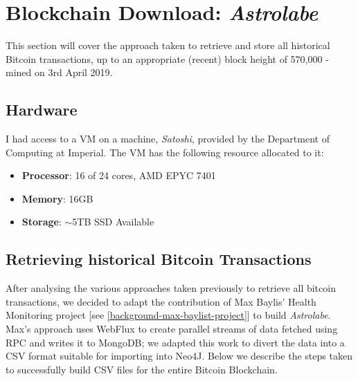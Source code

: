 \chapter{Blockchain Download: \textit{Astrolabe}}\label{section-blockchain-download}
This section will cover the approach taken to retrieve and store all historical Bitcoin transactions, up to an appropriate (recent) block height of 570,000 - mined on 3rd April 2019. 

\section{Hardware}\label{satoshi-specs}
I had access to a VM on a machine, \textit{Satoshi}, provided by the Department of Computing at Imperial.  The VM has the following resource allocated to it:
\begin{itemize}
    \item \textbf{Processor}: 16 of 24 cores, AMD EPYC 7401
    \item \textbf{Memory}: 16GB
    \item \textbf{Storage}: $\sim$5TB SSD Available
\end{itemize}

\section{Retrieving historical Bitcoin Transactions}
After analysing the various approaches taken previously to retrieve all bitcoin transactions, we decided to adapt the contribution of Max Baylis' Health Monitoring project [see \ref{background-max-baylist-project}] to build \textit{Astrolabe}. Max's approach uses WebFlux to create parallel streams of data fetched using RPC and writes it to MongoDB; we adapted this work to divert the data into a CSV format suitable for importing into Neo4J. Below we describe the steps taken to successfully build CSV files for the entire Bitcoin Blockchain. 


